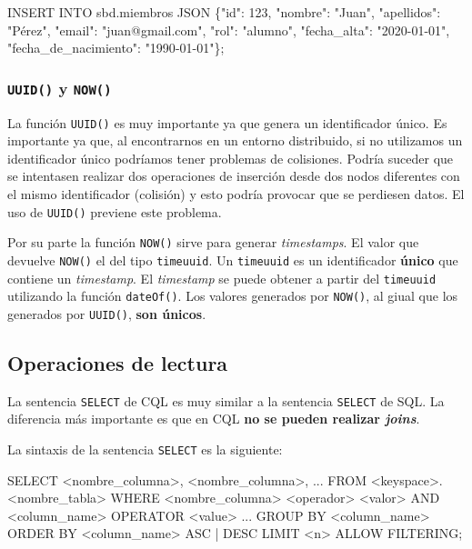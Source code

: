 \documentclass[
]{book}
\newenvironment{Shaded}{}{}
\newcommand{\NormalTok}[1]{#1}
\begin{document}
\begin{Shaded}
\begin{Highlighting}[]
\NormalTok{INSERT INTO sbd.miembros JSON \textquotesingle{}\{"id": 123, "nombre": "Juan", "apellidos": "Pérez", "email": "juan@gmail.com", "rol": "alumno", "fecha\_alta": "2020{-}01{-}01", "fecha\_de\_nacimiento": "1990{-}01{-}01"\}\textquotesingle{};}
\end{Highlighting}
\end{Shaded}

\subsubsection{\texorpdfstring{\texttt{UUID()} y \texttt{NOW()}}{UUID() y NOW()}}\label{uuid-y-now}

La función \texttt{UUID()} es muy importante ya que genera un identificador único. Es importante ya que, al encontrarnos en un entorno distribuido, si no utilizamos un identificador único podríamos tener problemas de colisiones. Podría suceder que se intentasen realizar dos operaciones de inserción desde dos nodos diferentes con el mismo identificador (colisión) y esto podría provocar que se perdiesen datos. El uso de \texttt{UUID()} previene este problema.

Por su parte la función \texttt{NOW()} sirve para generar \emph{timestamps}. El valor que devuelve \texttt{NOW()} el del tipo \texttt{timeuuid}. Un \texttt{timeuuid} es un identificador \textbf{único} que contiene un \emph{timestamp}. El \emph{timestamp} se puede obtener a partir del \texttt{timeuuid} utilizando la función \texttt{dateOf()}. Los valores generados por \texttt{NOW()}, al giual que los generados por \texttt{UUID()}, \textbf{son únicos}.

\subsection{Operaciones de lectura}\label{operaciones-de-lectura}

La sentencia \texttt{SELECT} de CQL es muy similar a la sentencia \texttt{SELECT} de SQL. La diferencia más importante es que en CQL \textbf{no se pueden realizar \emph{joins}}.

La sintaxis de la sentencia \texttt{SELECT} es la siguiente:

\begin{Shaded}
\begin{Highlighting}[]
\NormalTok{SELECT \textless{}nombre\_columna\textgreater{}, \textless{}nombre\_columna\textgreater{}, ...}
\NormalTok{FROM \textless{}keyspace\textgreater{}.\textless{}nombre\_tabla\textgreater{}}
\NormalTok{WHERE \textless{}nombre\_columna\textgreater{}}
\NormalTok{  \textless{}operador\textgreater{} \textless{}valor\textgreater{}}
\NormalTok{  AND \textless{}column\_name\textgreater{}}
\NormalTok{  OPERATOR \textless{}value\textgreater{}}
\NormalTok{  ...}
\NormalTok{GROUP BY \textless{}column\_name\textgreater{}}
\NormalTok{ORDER BY \textless{}column\_name\textgreater{} ASC | DESC}
\NormalTok{LIMIT \textless{}n\textgreater{}}
\NormalTok{ALLOW FILTERING;}
\end{Highlighting}
\end{Shaded}
\end{document}
